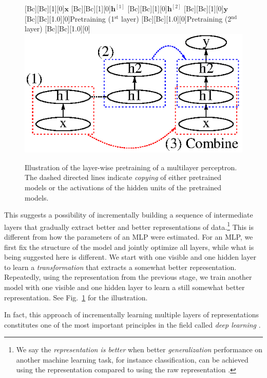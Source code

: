 \documentclass{now}
\newcommand{\qlay}[1]{\left[#1\right]}
\newcommand{\vect}[1]{\mathbf{#1}}
\newcommand{\vh}[0]{\vect{h}}
\newcommand{\vx}[0]{\vect{x}}
\newcommand{\vy}[0]{\vect{y}}
\begin{document}
\begin{figure}[t]
    \centering
    [Bc][Bc][1][0]{$\vx$}
    [Bc][Bc][1][0]{$\vh^{\qlay{1}}$}
    [Bc][Bc][1][0]{$\vh^{\qlay{2}}$}
    [Bc][Bc][1][0]{$\vy$}
    [Bc][Bc][1.0][0]{Pretraining
    (1$^\text{st}$ layer)}
    [Bc][Bc][1.0][0]{Pretraining
    (2$^\text{nd}$ layer)}
    [Bc][Bc][1.0][0]{}
    \includegraphics[width=0.7\columnwidth]{../figures/pretrain_mlp.eps}
    \caption{Illustration of the layer-wise pretraining of
    a multilayer perceptron. The dashed directed lines
    indicate \textit{copying} of either pretrained models or
    the activations of the hidden units of the pretrained
    models.}
    \label{fig:incr_feat}
\end{figure}

This suggests a possibility of incrementally building a
sequence of intermediate layers that gradually extract
better and better representations of data.\footnote{We say
the \textit{representation is better} when better
\textit{generalization} performance on another machine
learning task, for instance classification, can be achieved
using the representation compared to using the raw
representation \citep{Bengio2007nips}.} This is different
from
how the parameters of an MLP were estimated. For an MLP, we
first fix the structure of the model and jointly optimize
all layers, while what is being suggested here is different. We start with one visible and one hidden
layer to learn a \textit{transformation} that extracts a
somewhat better representation. Repeatedly, using the
representation from the previous stage, we train another
model with one visible and one hidden layer to learn a
still somewhat
better representation. See Fig.~\ref{fig:incr_feat}
for the illustration.

In fact, this approach of incrementally learning multiple
layers of representations constitutes one of the most important
principles in the field called \textit{deep learning}
\citep[see, e.g.,][]{Bengio2009a}.
\end{document}
